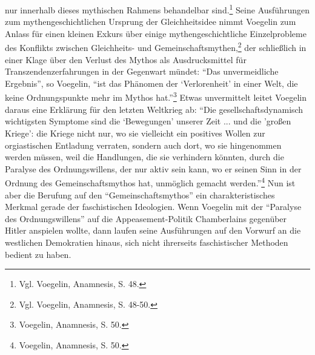 nur innerhalb dieses mythischen Rahmens behandelbar sind.\footnote{Vgl.
  Voegelin, Anamnesis, S.  48.}  Seine Ausführungen zum mythengeschichtlichen
Ursprung der Gleichheitsidee nimmt Voegelin zum Anlass für einen kleinen
Exkurs über einige mythengeschichtliche Einzelprobleme des Konflikts zwischen
Gleichheits- und Gemeinschaftsmythen,\footnote{Vgl.  Voegelin, Anamnesis, S.
  48-50.} der schließlich in einer Klage über den Verlust des Mythos als
Ausdrucksmittel für Transzendenzerfahrungen in der Gegenwart mündet: "`Das
unvermeidliche Ergebnis"', so Voegelin, "`ist das Phänomen der `Verlorenheit'
in einer Welt, die keine Ordnungspunkte mehr im Mythos
hat."'\footnote{Voegelin, Anamnesis, S. 50.} Etwas unvermittelt leitet
Voegelin daraus eine Erklärung für den letzten Weltkrieg ab: "`Die
gesellschaftsdynamisch wichtigsten Symptome sind die `Bewegungen' unserer Zeit
... und die 'großen Kriege': die Kriege nicht nur, wo sie vielleicht ein
positives Wollen zur orgiastischen Entladung verraten, sondern auch dort, wo
sie hingenommen werden müssen, weil die Handlungen, die sie verhindern
könnten, durch die Paralyse des Ordnungswillens, der nur aktiv sein kann, wo
er seinen Sinn in der Ordnung des Gemeinschaftsmythos hat, unmöglich gemacht
werden."'\footnote{Voegelin, Anamnesis, S. 50.} Nun ist aber die Berufung auf
den "`Gemeinschaftsmythos"' ein charakteristisches Merkmal gerade der
faschistischen Ideologien. Wenn Voegelin mit der "`Paralyse des
Ordnungswillens"' auf die Appeasement-Politik Chamberlains gegenüber Hitler
anspielen wollte, dann laufen seine Ausführungen auf den Vorwurf an die
westlichen Demokratien hinaus, sich nicht ihrerseits faschistischer Methoden
bedient zu haben.

